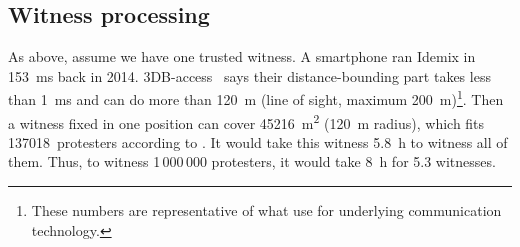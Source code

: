 

\subsection{Witness processing}

As above, assume we have one trusted witness.
A smartphone ran Idemix in \SI{153}{\milli\second} back in 2014.
3DB-access~\cite{3db-access} says their distance-bounding part takes less than 
\SI{1}{\milli\second} and can do more than \SI{120}{\metre} (line of sight, 
maximum \SI{200}{\metre})\footnote{%
  These numbers are representative of what \textcite{DB-Schnorr} use for 
  underlying communication technology.
}.
Then a witness fixed in one position can cover \SI{45216}{\square\metre} 
(\SI{120}{\metre} radius), which fits 137018~protesters according to 
\textcite{2016DemonstrationsInSeoul}.
It would take this witness \SI{5.8}{\hour} to witness all of them.
Thus, to witness 1\,000\,000 protesters, it would take \SI{8}{\hour} for 5.3 
witnesses.

